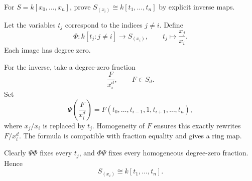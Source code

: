 \begin{problem}\label{prob:vi34-04}
For \(S=k[x_0,\ldots,x_n]\), prove \(S_{(x_i)}\cong k[t_1,\ldots,t_n]\) by explicit inverse maps.
\end{problem}

\ifdefined\FullProblemDossiers
\begin{solution}
Let the variables \(t_j\) correspond to the indices \(j\neq i\). Define
\[
\Phi:k[t_j:j\neq i]\longrightarrow S_{(x_i)},
\qquad
t_j\longmapsto \frac{x_j}{x_i}.
\]
Each image has degree zero.

For the inverse, take a degree-zero fraction
\[
\frac{F}{x_i^d},
\qquad
F\in S_d.
\]
Set
\[
\Psi\!\left(\frac{F}{x_i^d}\right)
=
F(t_0,\ldots,t_{i-1},1,t_{i+1},\ldots,t_n),
\]
where \(x_j/x_i\) is replaced by \(t_j\). Homogeneity of \(F\) ensures this exactly rewrites \(F/x_i^d\).
The formula is compatible with fraction equality and gives a ring map.

Clearly \(\Psi\Phi\) fixes every \(t_j\), and \(\Phi\Psi\) fixes every homogeneous degree-zero fraction. Hence
\[
\boxed{S_{(x_i)}\cong k[t_1,\ldots,t_n]}.
\]
\end{solution}
\fi
